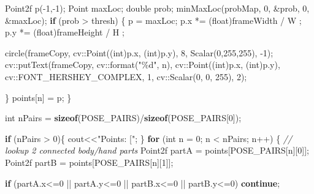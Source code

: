 \documentclass[
  12pt,
  a4paper,
]{article}
\newenvironment{Shaded}{}{}
\newcommand{\CommentTok}[1]{\textcolor[rgb]{0.38,0.63,0.69}{\textit{#1}}}
\newcommand{\ControlFlowTok}[1]{\textcolor[rgb]{0.00,0.44,0.13}{\textbf{#1}}}
\newcommand{\DataTypeTok}[1]{\textcolor[rgb]{0.56,0.13,0.00}{#1}}
\newcommand{\DecValTok}[1]{\textcolor[rgb]{0.25,0.63,0.44}{#1}}
\newcommand{\KeywordTok}[1]{\textcolor[rgb]{0.00,0.44,0.13}{\textbf{#1}}}
\newcommand{\NormalTok}[1]{#1}
\newcommand{\SpecialCharTok}[1]{\textcolor[rgb]{0.25,0.44,0.63}{#1}}
\newcommand{\StringTok}[1]{\textcolor[rgb]{0.25,0.44,0.63}{#1}}
\begin{document}
\begin{Shaded}
\begin{Highlighting}[numbers=left,,]
\NormalTok{        Point2f p({-}}\DecValTok{1}\NormalTok{,{-}}\DecValTok{1}\NormalTok{);}
\NormalTok{        Point maxLoc;}
        \DataTypeTok{double}\NormalTok{ prob;}
\NormalTok{        minMaxLoc(probMap, }\DecValTok{0}\NormalTok{, \&prob, }\DecValTok{0}\NormalTok{, \&maxLoc);}
        \ControlFlowTok{if}\NormalTok{ (prob \textgreater{} thresh)}
\NormalTok{        \{}
\NormalTok{            p = maxLoc;}
\NormalTok{            p.x *= (}\DataTypeTok{float}\NormalTok{)frameWidth / W ;}
\NormalTok{            p.y *= (}\DataTypeTok{float}\NormalTok{)frameHeight / H ;}

\NormalTok{            circle(frameCopy, cv::Point((}\DataTypeTok{int}\NormalTok{)p.x, (}\DataTypeTok{int}\NormalTok{)p.y), }\DecValTok{8}\NormalTok{, Scalar(}\DecValTok{0}\NormalTok{,}\DecValTok{255}\NormalTok{,}\DecValTok{255}\NormalTok{), {-}}\DecValTok{1}\NormalTok{);}
\NormalTok{            cv::putText(frameCopy, cv::format(}\StringTok{"}\SpecialCharTok{\%d}\StringTok{"}\NormalTok{, n), cv::Point((}\DataTypeTok{int}\NormalTok{)p.x, (}\DataTypeTok{int}\NormalTok{)p.y), cv::FONT\_HERSHEY\_COMPLEX, }\DecValTok{1}\NormalTok{, cv::Scalar(}\DecValTok{0}\NormalTok{, }\DecValTok{0}\NormalTok{, }\DecValTok{255}\NormalTok{), }\DecValTok{2}\NormalTok{);}

\NormalTok{        \}}
\NormalTok{        points[n] = p;}
\NormalTok{    \}}

    \DataTypeTok{int}\NormalTok{ nPairs = }\KeywordTok{sizeof}\NormalTok{(POSE\_PAIRS)/}\KeywordTok{sizeof}\NormalTok{(POSE\_PAIRS[}\DecValTok{0}\NormalTok{]);}

    \ControlFlowTok{if}\NormalTok{ (nPairs \textgreater{} }\DecValTok{0}\NormalTok{)\{}
\NormalTok{        cout\textless{}\textless{}}\StringTok{"Points: ["}\NormalTok{;}
\NormalTok{    \}}
    \ControlFlowTok{for}\NormalTok{ (}\DataTypeTok{int}\NormalTok{ n = }\DecValTok{0}\NormalTok{; n \textless{} nPairs; n++)}
\NormalTok{    \{}
        \CommentTok{// lookup 2 connected body/hand parts}
\NormalTok{        Point2f partA = points[POSE\_PAIRS[n][}\DecValTok{0}\NormalTok{]];}
\NormalTok{        Point2f partB = points[POSE\_PAIRS[n][}\DecValTok{1}\NormalTok{]];}

        \ControlFlowTok{if}\NormalTok{ (partA.x\textless{}=}\DecValTok{0}\NormalTok{ || partA.y\textless{}=}\DecValTok{0}\NormalTok{ || partB.x\textless{}=}\DecValTok{0}\NormalTok{ || partB.y\textless{}=}\DecValTok{0}\NormalTok{)}
            \ControlFlowTok{continue}\NormalTok{;}


\end{Highlighting}
\end{Shaded}
\end{document}

